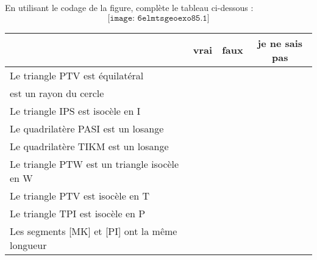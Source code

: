 En utilisant le codage de la figure, complète le tableau ci-dessous :
\[\texttt{[image: 6elmtsgeoexo85.1]}\]
\renewcommand{\arraystretch}{1.3}
\begin{center}
\begin{tabular}{|p{9cm}|c|c|c|}
  \hline \centering{Affirmation}& vrai & faux & je ne sais pas \\
  \hline Le triangle PTV est équilatéral &&& \\
  \hline [TS] est un rayon du cercle &&& \\
  \hline Le triangle IPS est isocèle en I &&& \\ 
  \hline Le quadrilatère PASI est un losange &&& \\   
  \hline Le quadrilatère TIKM est un losange &&& \\   
  \hline Le triangle PTW est un triangle isocèle en W &&& \\   
  \hline Le triangle PTV est isocèle en T &&& \\   
  \hline Le triangle TPI est isocèle en P &&& \\    
  \hline Les segments [MK] et [PI] ont la même longueur &&& \\    
  \hline
\end{tabular}
\end{center}
\renewcommand{\arraystretch}{1}